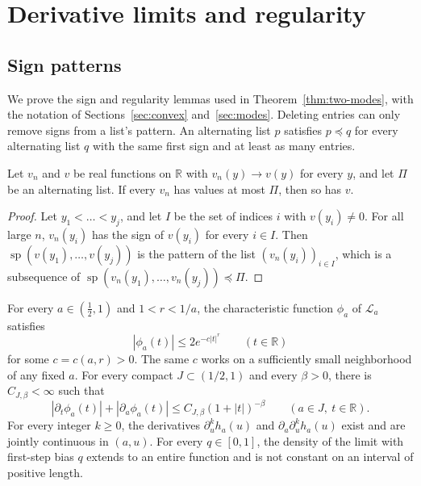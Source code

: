 \section{Derivative limits and regularity}\label{app:modes}



\subsection{Sign patterns}

We prove the sign and regularity lemmas used in Theorem~\ref{thm:two-modes}, with the
notation of Sections~\ref{sec:convex} and~\ref{sec:modes}.
Deleting entries can only remove signs from a list's pattern. An alternating list $p$ satisfies
$p\preceq q$ for every alternating list $q$ with the same first sign and at
least as many entries.

\begin{lemma}\label{lem:sp-limit}
Let $v_n$ and $v$ be real functions on $\mathbb R$ with $v_n(y)\to v(y)$ for
every $y$, and let $\Pi$ be an alternating list. If every $v_n$ has values at
most $\Pi$, then so has $v$.
\end{lemma}

\begin{proof}
Let $y_1<\dots<y_j$, and let $I$ be the set of indices $i$ with $v(y_i)\ne0$.
For all large $n$, $v_n(y_i)$ has the sign of $v(y_i)$ for every $i\in I$.
Then $\operatorname{sp}(v(y_1),\dots,v(y_j))$ is the pattern of the list
$(v_n(y_i))_{i\in I}$, which is a subsequence of
$\operatorname{sp}(v_n(y_1),\dots,v_n(y_j))\preceq\Pi$.
\end{proof}

\begin{lemma}\label{lem:analytic-density}
For every $a\in(\frac12,1)$ and $1<r<1/a$, the characteristic function
$\phi_a$ of $\mathcal L_a$ satisfies
\[
 |\phi_a(t)|\le 2e^{-c|t|^r}\qquad(t\in\mathbb R)
\]
for some $c=c(a,r)>0$. The same $c$ works on a sufficiently small
neighborhood of any fixed $a$. For every compact
$J\subset(1/2,1)$ and every $\beta>0$, there is $C_{J,\beta}<\infty$ such that
\[
 |\partial_t\phi_a(t)|+|\partial_a\phi_a(t)|
 \le C_{J,\beta}(1+|t|)^{-\beta}
 \qquad(a\in J,\ t\in\mathbb R).
\]
For every integer $k\ge0$, the derivatives $\partial_u^k h_a(u)$ and
$\partial_a\partial_u^k h_a(u)$ exist and are jointly continuous in $(a,u)$.
For every $q\in[0,1]$, the density of the limit with first-step bias $q$
extends to an entire function and is not constant on an interval of
positive length.
\end{lemma}

